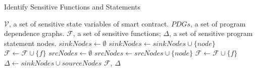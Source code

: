 \begin{algorithm}[t]
    \caption{Identify Sensitive Functions and Statements}\label{algo:identify}
    \begin{algorithmic}[1]
        \Require $\mathcal{V}$, a set of sensitive state variables of smart contract. 
        \Require $PDGs$, a set of program dependence graphs.
        \Ensure $\mathcal{F}$, a set of sensitive functions; $\Delta$, a set of sensitive program statement nodes.
        \State $sinkNodes \gets \emptyset$  \label{sink:start}
                     \label{check:cond1}
                        \State $sinkNodes \gets sinkNodes \cup \{node\}$ \label{sink:update}
                        \State $\mathcal{F} \gets \mathcal{F} \cup \{f\}$ \label{sensitive:update1}                      
                    \EndIf
                \EndFor
        \EndFor \label{sink:end}
        \State $srcNodes \gets \emptyset$  \label{source:start}
                         \label{check:cond2}
                            \State $srcNodes \gets srcNodes \cup \{node\}$ \label{source:update}
                            \State $\mathcal{F} \gets \mathcal{F} \cup \{f\}$ \label{sensitive:update2}                      
                        \EndIf
                    \EndFor
            \EndFor
        \EndFor \label{source:end}
        \State $\Delta \gets sinkNodes \cup sourceNodes$ 
        \State \Return $\mathcal{F}$, $\Delta$ 
\end{algorithmic}
\end{algorithm}


